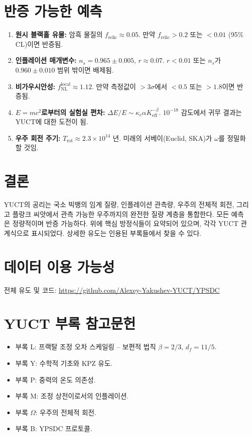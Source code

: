 \documentclass[12pt,a4paper]{article}
\begin{document}
	\section{반증 가능한 예측}
	
	\begin{enumerate}
		\item \textbf{원시 블랙홀 유물:} 암흑 물질의 \(f_{\mathrm{relic}} \approx 0.05\). 만약 \(f_{\mathrm{relic}}>0.2\) 또는 \(<0.01\) (95\% CL)이면 반증됨.
		\item \textbf{인플레이션 매개변수:} \(n_s = 0.965\pm0.005\), \(r\approx 0.07\). \(r<0.01\) 또는 \(n_s\)가 \(0.960\pm0.010\) 범위 밖이면 배제됨.
		\item \textbf{비가우시안성:} \(f_{\mathrm{NL}}^{\mathrm{local}} \approx 1.12\). 만약 측정값이 \(>3\sigma\)에서 \(<0.5\) 또는 \(>1.8\)이면 반증됨.
		\item \textbf{\(E=mc^2\)로부터의 실험실 편차:} \(\Delta E/E \sim \kappa_c\alpha K_{\mathrm{eff}}^{-\beta}\). \(10^{-18}\) 감도에서 귀무 결과는 YUCT에 대한 도전이 됨.
		\item \textbf{우주 회전 주기:} \(T_{\mathrm{rot}} \approx 2.3\times10^{14}\) 년. 미래의 서베이(Euclid, SKA)가 \(\omega\)를 정밀화할 것임.
	\end{enumerate}
	
	\section{결론}
	
	YUCT의 공리는 국소 빅뱅의 임계 질량, 인플레이션 관측량, 우주의 전체적 회전, 그리고 플랑크 씨앗에서 관측 가능한 우주까지의 완전한 질량 계층을 통합한다. 모든 예측은 정량적이며 반증 가능하다. 위에 핵심 방정식들이 요약되어 있으며, 각각 YUCT 관계식으로 표시되었다. 상세한 유도는 인용된 부록들에서 찾을 수 있다.
	
	\section*{데이터 이용 가능성}
	
	전체 유도 및 코드: \url{https://github.com/Alexey-Yakushev-YUCT/YPSDC}
	
	\section*{YUCT 부록 참고문헌}
	\begin{itemize}
		\item 부록 L: 프랙탈 조정 오차 스케일링 – 보편적 법칙 \(\beta=2/3\), \(d_f=11/5\).
		\item 부록 Y: 수학적 기초와 KPZ 유도.
		\item 부록 P: 중력의 온도 의존성.
		\item 부록 M: 조정 상전이로서의 인플레이션.
		\item 부록 \(\Omega\): 우주의 전체적 회전.
		\item 부록 B: YPSDC 프로토콜.
	\end{itemize}
	
\end{document}
